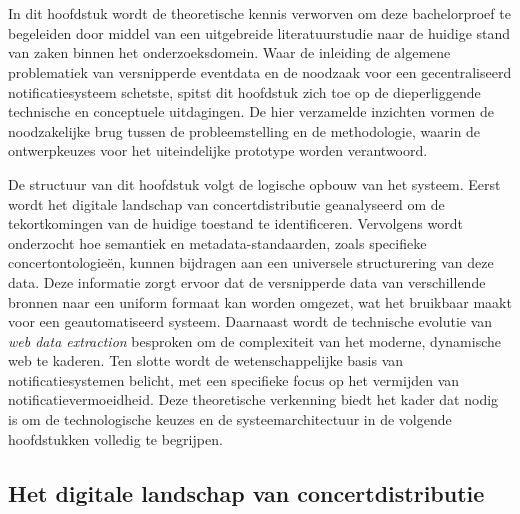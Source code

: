 \chapter{}%
\label{ch:stand-van-zaken}



In dit hoofdstuk wordt de theoretische kennis verworven om deze bachelorproef te begeleiden door middel van een uitgebreide literatuurstudie naar de huidige stand van zaken binnen het onderzoeksdomein. 
Waar de inleiding de algemene problematiek van versnipperde eventdata en de noodzaak voor een gecentraliseerd notificatiesysteem schetste, 
spitst dit hoofdstuk zich toe op de dieperliggende technische en conceptuele uitdagingen. 
De hier verzamelde inzichten vormen de noodzakelijke brug tussen de probleemstelling en de methodologie, 
waarin de ontwerpkeuzes voor het uiteindelijke prototype worden verantwoord.

De structuur van dit hoofdstuk volgt de logische opbouw van het systeem. Eerst wordt het digitale landschap van concertdistributie geanalyseerd om de tekortkomingen van de huidige toestand te identificeren. 
Vervolgens wordt onderzocht hoe semantiek en metadata-standaarden, zoals specifieke concertontologieën, kunnen bijdragen aan een universele structurering van deze data. 
Deze informatie zorgt ervoor dat de versnipperde data van verschillende bronnen naar een uniform formaat kan worden omgezet, wat het bruikbaar maakt voor een geautomatiseerd systeem.
Daarnaast wordt de technische evolutie van \textit{web data extraction} besproken om de complexiteit van het moderne, dynamische web te kaderen. 
Ten slotte wordt de wetenschappelijke basis van notificatiesystemen belicht, met een specifieke focus op het vermijden van notificatievermoeidheid. 
Deze theoretische verkenning biedt het kader dat nodig is om de technologische keuzes en de systeemarchitectuur in de volgende hoofdstukken volledig te begrijpen.

\section{Het digitale landschap van concertdistributie}

